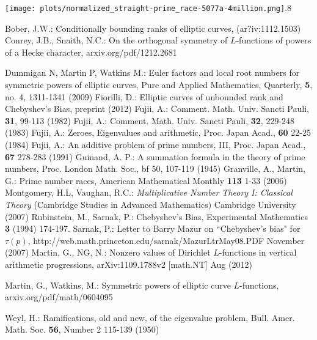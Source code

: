 \documentclass[11pt]{article}
\theoremstyle{plain}
\theoremstyle{definition}
\numberwithin{equation}{section}
\numberwithin{figure}{section}
\numberwithin{table}{section}
\begin{document}
    \texttt{[image: plots/normalized\_straight-prime\_race-5077a-4million.png]}{.8}~\label{nr389}






\begin{thebibliography}{bib}
 \label{B} Bober, J.W.: Conditionally bounding ranks of elliptic curves, (ar?iv:1112.1503)
 \label{C-S} Conrey, J.B., Snaith, N.C.:  On the orthogonal symmetry of $L$-functions of powers of a Hecke character, arxiv.org/pdf/1212.2681


 \label{DMW} Dummigan N, Martin P, Watkins M.: Euler factors and local root numbers for symmetric powers of elliptic curves, Pure and Applied Mathematics, Quarterly, {\bf 5},  no. 4, 1311-1341  (2009)
  \label{F}  Fiorilli, D.: Elliptic curves of unbounded rank and Chebyshev's Bias, preprint (2012)
        \label{Fu1} Fujii, A.:  Comment. Math. Univ. Sancti Pauli, {\bf 31}, 99-113 (1982)
        \label{Fu2} Fujii, A.:  Comment. Math. Univ. Sancti Pauli, {\bf 32}, 229-248 (1983)
      \label{Fu3} Fujii, A.: Zeroes, Eigenvalues and arithmetic, Proc. Japan Acad., {\bf 60} 22-25 (1984)
    \label{Fu4} Fujii, A.: An additive problem of prime numbers, III, Proc. Japan Acad., {\bf 67} 278-283 (1991)
   \label{G} Guinand, A. P.: A summation formula in the theory of prime numbers, Proc. London Math. Soc., {bf 50}, 107-119 (1945)
 \label{GM}  Granville, A., Martin, G.:  Prime number races,
American Mathematical Monthly {\bf 113} 1-33 (2006)
  \label{MV} Montgomery, H.L, Vaughan, R.C.:   {\it Multiplicative Number Theory I: Classical Theory} (Cambridge Studies in Advanced Mathematics) Cambridge University (2007)
  \label{R-S}   Rubinstein, M., Sarnak, P.: Chebyshev's Bias,  Experimental  Mathematics {\bf 3}  (1994) 174-197.
    \label{S} Sarnak, P.: Letter to Barry Mazur on ``Chebyshev's bias" for $\tau(p)$, http://web.math.princeton.edu/sarnak/MazurLtrMay08.PDF  November (2007)
  \label{M-N} Martin, G., NG, N.: Nonzero values of Dirichlet $L$-functions in vertical arithmetic progressions,
    arXiv:1109.1788v2 [math.NT]  Aug (2012)

        \label{M-W} Martin, G., Watkins, M.:  Symmetric powers of elliptic curve $L$-functions, arxiv.org/pdf/math/0604095

     \label{W}  Weyl, H.:  Ramifications, old and new, of the eigenvalue problem,  Bull. Amer. Math. Soc. {\bf 56}, Number 2 115-139 (1950)
\end{thebibliography}



\end{document}
